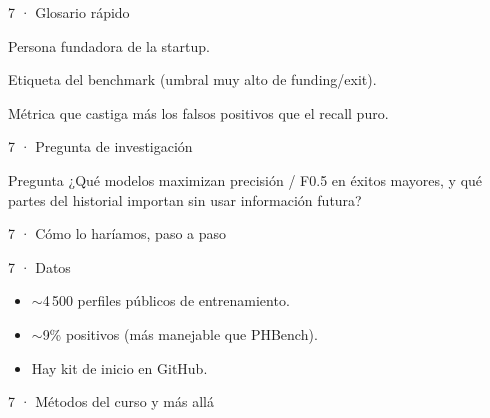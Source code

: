\begin{frame}{7 · Glosario rápido}
  \begin{description}[font=\bfseries\scriptsize,style=nextline,leftmargin=1.6cm]
    \item[Founder] Persona fundadora de la startup.
    \item[Major success] Etiqueta del benchmark (umbral muy alto de funding/exit).
    \item[F0.5] Métrica que castiga más los falsos positivos que el recall puro.
  \end{description}
\end{frame}

\begin{frame}{7 · Pregunta de investigación}
  \begin{block}{Pregunta}
    ¿Qué modelos maximizan precisión / F0.5 en éxitos mayores, y qué partes del historial importan sin usar información futura?
  \end{block}
\end{frame}

\begin{frame}{7 · Cómo lo haríamos, paso a paso}
\end{frame}

\begin{frame}{7 · Datos}
  \begin{itemize}
    \item $\sim$4\,500 perfiles públicos de entrenamiento.
    \item $\sim$9\% positivos (más manejable que PHBench).
    \item Hay kit de inicio en GitHub.
  \end{itemize}
\end{frame}

\begin{frame}{7 · Métodos del curso y más allá}
\end{frame}

